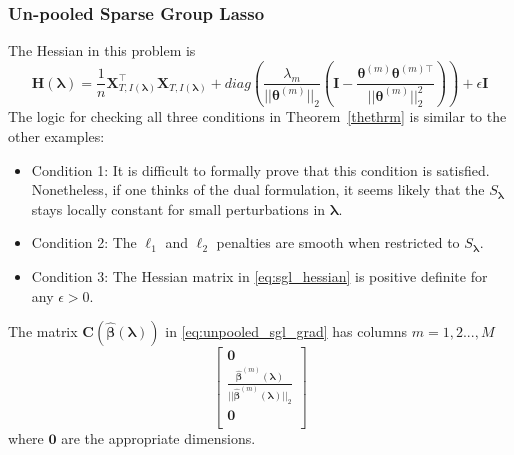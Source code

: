 \documentclass[12pt,letterpaper]{article}
\begin{document}
\subsubsection{Un-pooled Sparse Group Lasso}
The Hessian in this problem is
\begin{equation}
\boldsymbol{H}(\boldsymbol\lambda) =
\frac{1}{n} \boldsymbol X_{T, I(\boldsymbol \lambda)}^\top \boldsymbol X_{T, I(\boldsymbol \lambda)}
+ diag\left(
\frac{\lambda_m}{|| \boldsymbol \theta^{(m)}||_2}
\left (
\boldsymbol I - 
\frac{\boldsymbol \theta^{(m)} \boldsymbol \theta^{(m) \top}}{|| \boldsymbol \theta^{(m)}||_2^2}
\right )
\right)
+ \epsilon \boldsymbol I
\label{eq:sgl_hessian}
\end{equation}
The logic for checking all three conditions in Theorem~\ref{thethrm} is similar to the other examples:
\begin{itemize}
	\item[] Condition 1: It is difficult to formally prove that this condition is satisfied. Nonetheless, if one thinks of the dual formulation, it seems likely that the $S_{\boldsymbol{\lambda}}$ stays locally constant for small perturbations in $\boldsymbol{\lambda}$.
	\item[] Condition 2: The $\ell_1$ and $\ell_2$ penalties are smooth when restricted to $S_{\boldsymbol{\lambda}}$.\hfill {}
	\item[] Condition 3: The Hessian matrix in \eqref{eq:sgl_hessian} is positive definite for any $\epsilon > 0$. \hfill {}
\end{itemize}


The matrix $\boldsymbol C(\hat {\boldsymbol \beta}(\boldsymbol \lambda))$ in \eqref{eq:unpooled_sgl_grad} has columns $m=1,2...,M$ 
\begin{equation}
\begin{bmatrix}
\boldsymbol 0\\
\frac{\hat {\boldsymbol \beta}^{(m)}(\boldsymbol \lambda)}{||\hat{\boldsymbol \beta}^{(m)}(\boldsymbol \lambda)||_2}\\
\boldsymbol 0\\
\end{bmatrix}
\end{equation}
where $\boldsymbol 0$ are the appropriate dimensions.
\end{document}
